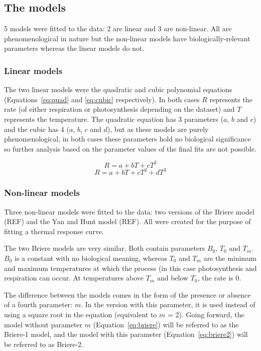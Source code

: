 \documentclass[11pt]{article}
\begin{document}
	\subsection{The models}
	5 models were fitted to the data: 2 are linear and 3 are non-linear. All are phenomenological in nature but the non-linear models have biologically-relevant parameters whereas the linear models do not. 
	
	\subsubsection*{Linear models}	
	The two linear models were the quadratic and cubic polynomial equations (Equations~\ref{eq:quad} and \ref{eq:cubic} respectively). In both cases $R$ represents the rate (of either respiration or photosynthesis depending on the dataset) and $T$ represents the temperature. The quadratic equation has 3 parameters ($a$, $b$ and $c$) and the cubic has 4 ($a$, $b$, $c$ and $d$), but as these models are purely phenomenological, in both cases these parameters hold no biological significance so further analysis based on the parameter values of the final fits are not possible.
	
	\begin{equation} \label{eq:quad}
	R = a + bT + cT^2
	\end{equation}
	\begin{equation} \label{eq:cubic}
	R = a + bT + cT^2 + dT^3
	\end{equation}
	
	\subsubsection*{Non-linear models}
	Three non-linear models were fitted to the data: two versions of the Briere model (REF) and the Yan and Hunt model (REF). All were created for the purpose of fitting a thermal response curve.
	
	The two Briere models are very similar. Both contain parameters $B_0$, $T_0$ and $T_m$. $B_0$ is a constant with no biological meaning, whereas $T_0$ and $T_m$ are the minimum and maximum temperatures at which the process (in this case photosynthesis and respiration can occur. At temperatures above $T_m$ and below $T_0$, the rate is 0.
	
	The difference between the models comes in the form of the presence or absence of a fourth parameter: $m$. In the version with this parameter, it is used instead of using a square root in the equation (equivalent to $m$ = 2). Going forward, the model without parameter $m$ (Equation~\ref{eq:briere}) will be referred to as the Briere-1 model, and the model with this parameter (Equation~\ref{eq:briere2}) will be referred to as Briere-2.
	
\end{document}
